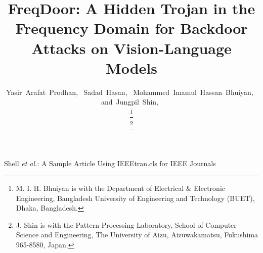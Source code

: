 \documentclass[lettersize,journal]{IEEEtran}
\begin{document}
\title{FreqDoor: A Hidden Trojan in the Frequency Domain for Backdoor Attacks on Vision-Language Models}



\author{Yasir~Arafat~Prodhan,~
        Sadad~Hasan,~
        Mohammed~Imamul~Hassan~Bhuiyan,~
        and~Jungpil~Shin,~%
        
\thanks{M. I. H. Bhuiyan is with the
Department of Electrical \& Electronic Engineering,
Bangladesh University of Engineering and Technology
(BUET), Dhaka, Bangladesh.}%

\thanks{J. Shin is with the Pattern Processing Laboratory,
School of Computer Science and Engineering,
The University of Aizu, Aizuwakamatsu,
Fukushima 965-8580, Japan.}%
}



%
{Shell \MakeLowercase{\textit{et al.}}: A Sample Article Using IEEEtran.cls for IEEE Journals}


\maketitle
\end{document}
